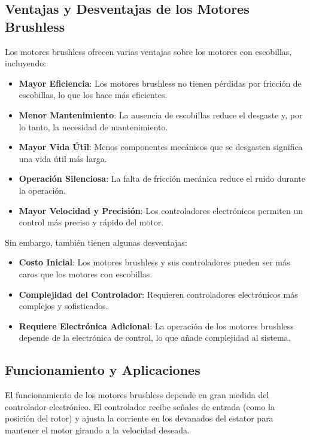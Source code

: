 \documentclass[../main]{subfiles}
\begin{document}
\subsection*{Ventajas y Desventajas de los Motores Brushless}

Los motores brushless ofrecen varias ventajas sobre los motores con escobillas, incluyendo:

\begin{itemize}
    \item \textbf{Mayor Eficiencia}: Los motores brushless no tienen pérdidas por fricción de escobillas, lo que los hace más eficientes.
    \item \textbf{Menor Mantenimiento}: La ausencia de escobillas reduce el desgaste y, por lo tanto, la necesidad de mantenimiento.
    \item \textbf{Mayor Vida Útil}: Menos componentes mecánicos que se desgasten significa una vida útil más larga.
    \item \textbf{Operación Silenciosa}: La falta de fricción mecánica reduce el ruido durante la operación.
    \item \textbf{Mayor Velocidad y Precisión}: Los controladores electrónicos permiten un control más preciso y rápido del motor.
\end{itemize}

Sin embargo, también tienen algunas desventajas:

\begin{itemize}
    \item \textbf{Costo Inicial}: Los motores brushless y sus controladores pueden ser más caros que los motores con escobillas.
    \item \textbf{Complejidad del Controlador}: Requieren controladores electrónicos más complejos y sofisticados.
    \item \textbf{Requiere Electrónica Adicional}: La operación de los motores brushless depende de la electrónica de control, lo que añade complejidad al sistema.
\end{itemize}

\subsection*{Funcionamiento y Aplicaciones}

El funcionamiento de los motores brushless depende en gran medida del controlador electrónico. El controlador recibe señales de entrada (como la posición del rotor) y ajusta la corriente en los devanados del estator para mantener el motor girando a la velocidad deseada.
\end{document}
